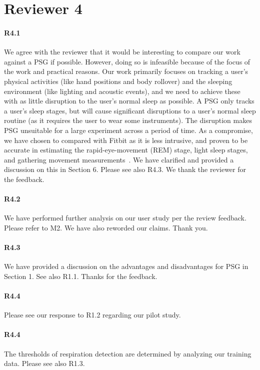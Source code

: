 \section*{Reviewer 4}

\paragraph{R4.1} We agree with the reviewer that it would be interesting to compare our work against a PSG if possible. However, doing so
is infeasible because of the focus of the work and practical reasons. Our work primarily focuses on tracking a user's physical activities
(like hand positions and body rollover) and the sleeping environment (like lighting and acoustic events), and we need to achieve these with
as little disruption to the user's normal sleep as possible. A PSG only tracks a user's sleep stages, but will cause significant
disruptions to a user's normal sleep routine (as it requires the user to wear some instruments). The disruption makes PSG unsuitable for a
large experiment across a period of time. As a compromise, we have chosen to compared with Fitbit as it is less intrusive, and proven to be
accurate in estimating the rapid-eye-movement (REM) stage, light sleep stages, and gathering movement
measurements~\cite{fitbit01,fitbit02,fitbit03}. We have clarified and provided a discussion on this in Section 6. Please see also R4.3. We
thank the reviewer for the feedback.

\paragraph{R4.2} We have performed further analysis on our user study per the review feedback. Please refer to M2. We have also reworded our
claims. Thank you. \vspace{-2mm}

\paragraph{R4.3} We have provided a discussion on the advantages and disadvantages for PSG in Section 1. See also R1.1. Thanks for the feedback.
\vspace{-2mm}
\paragraph{R4.4} Please see our response to R1.2 regarding our pilot study.
\vspace{-2mm}
\paragraph{R4.4} The thresholds of respiration detection are determined by analyzing our training data. Please
see also R1.3.
\vspace{-2mm}

